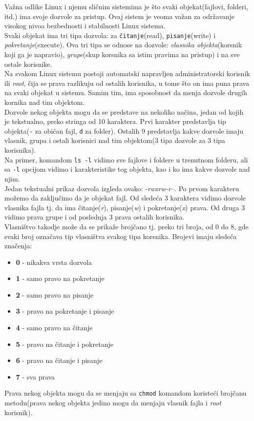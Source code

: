 Važna odlike Linux i njemu sličnim sistemima je što svaki objekat(fajlovi, folderi, itd.) ima svoje dozvole za pristup. Ovaj sistem je veoma važan za održavanje visokog nivoa bezbednosti i stabilnosti Linux sistema.\\
Svaki objekat ima tri tipa dozvola: za \texttt{čitanje}(read), \texttt{pisanje}(write) i \textit{pokretanje}(execute). Ova tri tipa se odnose na dozvole: \textit{vlasnika objekta}(korsnik koji ga je napravio), \textit{grupe}(skup korsnika sa istim pravima na pristup) i na sve ostale korisnike.\\
Na svakom Linux sistemu postoji automatski napravljen administratorski korisnik ili \textit{root}, čija se prava razlikuju od ostalih korisnika, u tome što on ima puna prava na svaki objekat u sistemu. Samim tim, ima sposobnost da menja dozvole drugih kornika nad tim objektom.\\
Dozvole nekog objekta mogu da se predstave na nekoliko načina, jedan od kojih je tekstualno, preko stringa od 10 karaktera. Prvi karakter predstavlja tip objekta(\texttt{-} za običan fajl, \texttt{d} za folder). Ostalih 9 predstavlja kakve dozvole imaju vlasnik, grupa i ostali korisnici nad tim objektom(3 tipa dozvole za 3 tipa korisnika).\\
Na primer, komandom \texttt{ls -l} vidimo sve fajlove i foldere u trenutnom folderu, ali sa \texttt{-l} opcijom vidimo i karakteristike tog objekta, kao i ko ima kakve dozvole nad njim.\\
Jedan tekstualni prikaz dozvola izgleda ovako: \textit{-rwxrw-r--}. Po prvom karakteru možemo da zaključimo da je objekat fajl. Od sledeća 3 karaktera vidimo dozvole vlasnika fajla tj. da ima čitanje(\textit{r}), pisanje(\textit{w}) i pokretanje(\textit{x}) prava. Od druga 3 vidimo prava grupe i od poslednja 3 prava ostalih korisnika.\\
Vlasništvo takodje može da se prikaže brojčano tj. preko tri broja, od 0 do 8, gde svaki broj označava tip vlasništva svakog tipa korsnika. Brojevi imaju sledeća značenja:
\begin{itemize}
\item \textbf{0} - nikakva vrsta dozvola
\item \textbf{1} - samo pravo na pokretanje
\item \textbf{2} - samo pravo na pisanje
\item \textbf{3} - pravo na pokretanje i pisanje
\item \textbf{4} - samo pravo na čitanje
\item \textbf{5} - pravo na čitanje i pokretanje
\item \textbf{6} - pravo na čitanje i pisanje
\item \textbf{7} - sva prava
\end{itemize}
Prava nekog objekta mogu da se menjaju sa \texttt{chmod} komandom koristeći brojčanu metodu(prava nekog objekta jedino mogu da menjaju vlasnik fajla i \textit{root} korisnik).